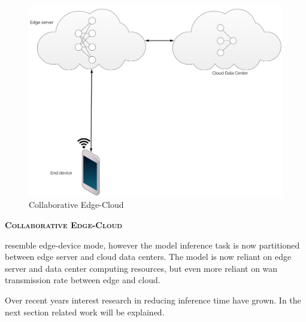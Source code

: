 \begin{minipage}{0.5\linewidth}
	\centering
	\begin{figure}
		\centering
		\includegraphics[width=\linewidth]{figures/models/edge_cloud}
		\caption[Collaborative Edge-Cloud]{Collaborative Edge-Cloud}
	\end{figure}
\end{minipage}
\hfill
\begin{minipage}{0.45\linewidth}
	\textbf{\textsc{Collaborative Edge-Cloud}}
	
	resemble edge-device mode, however the model inference task is now partitioned between edge server and cloud data centers. The model is now reliant on edge server and data center computing resources, but even more reliant on \gls{wan} transmission rate between edge and cloud.
\end{minipage}

Over recent years interest research in reducing inference time have grown. In the next section related work will be explained.  


